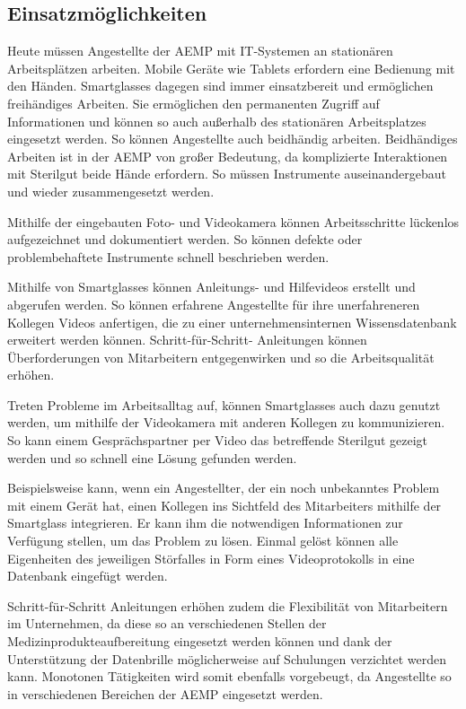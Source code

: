 \subsection{Einsatzmöglichkeiten}
\label{sec:Einsatzmoeglichkeiten}
Heute müssen Angestellte der AEMP mit IT-Systemen an stationären Arbeitsplätzen arbeiten. Mobile Geräte wie Tablets erfordern eine Bedienung mit den Händen. Smartglasses dagegen sind immer einsatzbereit und ermöglichen freihändiges Arbeiten. Sie ermöglichen den permanenten Zugriff auf Informationen und können so auch außerhalb des stationären Arbeitsplatzes eingesetzt werden. So können Angestellte auch beidhändig arbeiten. Beidhändiges Arbeiten ist in der AEMP von großer Bedeutung, da komplizierte Interaktionen mit Sterilgut beide Hände erfordern. So müssen Instrumente auseinandergebaut und wieder zusammengesetzt werden.

Mithilfe der eingebauten Foto- und Videokamera können Arbeitsschritte lückenlos aufgezeichnet und dokumentiert werden. So können defekte oder problembehaftete Instrumente schnell beschrieben werden.

Mithilfe von Smartglasses können Anleitungs- und Hilfevideos erstellt und abgerufen werden. So können erfahrene Angestellte für ihre unerfahreneren Kollegen Videos anfertigen, die zu einer unternehmensinternen Wissensdatenbank erweitert werden können. Schritt-für-Schritt- Anleitungen können Überforderungen von Mitarbeitern entgegenwirken und so die Arbeitsqualität erhöhen. 

Treten Probleme im Arbeitsalltag auf, können Smartglasses auch dazu genutzt werden, um mithilfe der Videokamera mit anderen Kollegen zu kommunizieren. So kann einem Gesprächspartner per Video das betreffende Sterilgut gezeigt werden und so schnell eine Lösung gefunden werden.

Beispielsweise kann, wenn ein Angestellter, der ein noch unbekanntes Problem mit einem Gerät hat, einen Kollegen ins Sichtfeld des Mitarbeiters mithilfe der Smartglass integrieren. Er kann ihm die notwendigen Informationen zur Verfügung stellen, um das Problem zu lösen. Einmal gelöst können alle Eigenheiten des jeweiligen Störfalles in Form eines Videoprotokolls in eine Datenbank eingefügt werden.

Schritt-für-Schritt Anleitungen erhöhen zudem die Flexibilität von Mitarbeitern im Unternehmen, da diese so an verschiedenen Stellen der Medizinprodukteaufbereitung eingesetzt werden können und dank der Unterstützung der Datenbrille möglicherweise auf Schulungen verzichtet werden kann. Monotonen Tätigkeiten wird somit ebenfalls vorgebeugt, da Angestellte so in verschiedenen Bereichen der AEMP eingesetzt werden.

